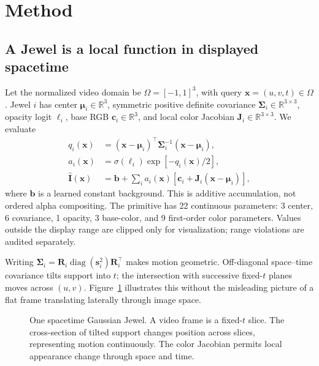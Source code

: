 \documentclass{article}
\newcommand{\R}{\mathbb{R}}
\begin{document}
\section{Method}

\subsection{A Jewel is a local function in displayed spacetime}

Let the normalized video domain be $\Omega=[-1,1]^3$, with query
$\mathbf{x}=(u,v,t)\in\Omega$. Jewel $i$ has center $\boldsymbol\mu_i\in\R^3$, symmetric positive
definite covariance $\boldsymbol\Sigma_i\in\R^{3\times3}$, opacity logit $\ell_i$, base RGB
$\mathbf{c}_i\in\R^3$, and local color Jacobian $\mathbf{J}_i\in\R^{3\times3}$. We evaluate
\begin{align}
q_i(\mathbf{x}) &= (\mathbf{x}-\boldsymbol\mu_i)^\top
  \boldsymbol\Sigma_i^{-1}(\mathbf{x}-\boldsymbol\mu_i), \\
a_i(\mathbf{x}) &= \sigma(\ell_i)\exp[-q_i(\mathbf{x})/2], \\
\widehat{\mathbf I}(\mathbf{x}) &= \mathbf b + \sum_i a_i(\mathbf{x})
  [\mathbf c_i+\mathbf J_i(\mathbf{x}-\boldsymbol\mu_i)],
\label{eq:render}
\end{align}
where $\mathbf b$ is a learned constant background. This is additive accumulation, not ordered
alpha compositing. The primitive has 22 continuous parameters: 3 center, 6 covariance, 1 opacity,
3 base-color, and 9 first-order color parameters. Values outside the display range are clipped only
for visualization; range violations are audited separately.

Writing $\boldsymbol\Sigma_i=\mathbf R_i\operatorname{diag}(\mathbf s_i^2)\mathbf R_i^\top$ makes
motion geometric. Off-diagonal space--time covariance tilts support into $t$; the intersection with
successive fixed-$t$ planes moves across $(u,v)$. Figure~\ref{fig:jewel} illustrates this without
the misleading picture of a flat frame translating laterally through image space.

\begin{figure}[t]
  \centering
  \resizebox{\linewidth}{!}{}
  \caption{One spacetime Gaussian Jewel. A video frame is a fixed-$t$ slice. The cross-section of
  tilted support changes position across slices, representing motion continuously. The color
  Jacobian permits local appearance change through space and time.}
  \label{fig:jewel}
\end{figure}
\end{document}
